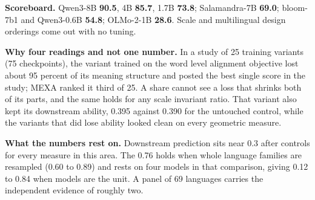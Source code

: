\documentclass[10pt]{article}
\begin{document}
\textbf{Scoreboard.} Qwen3-8B \textbf{90.5}, 4B \textbf{85.7}, 1.7B
\textbf{73.8}; Salamandra-7B \textbf{69.0}; bloom-7b1 and Qwen3-0.6B
\textbf{54.8}; OLMo-2-1B \textbf{28.6}. Scale and multilingual design
orderings come out with no tuning.

\textbf{Why four readings and not one number.} In a study of 25
training variants (75 checkpoints), the variant trained on the word
level alignment objective lost about 95 percent of its meaning
structure and posted the best single score in the study; MEXA ranked it
third of 25. A share cannot see a loss that shrinks both of its parts,
and the same holds for any scale invariant ratio. That variant also
kept its downstream ability, 0.395 against 0.390 for the untouched
control, while the variants that did lose ability looked clean on every
geometric measure.

\textbf{What the numbers rest on.} Downstream prediction sits near 0.3
after controls for every measure in this area. The 0.76 holds when
whole language families are resampled (0.60 to 0.89) and rests on four
models in that comparison, giving 0.12 to 0.84 when models are the
unit. A panel of 69 languages carries the independent evidence of
roughly two.
\end{document}

